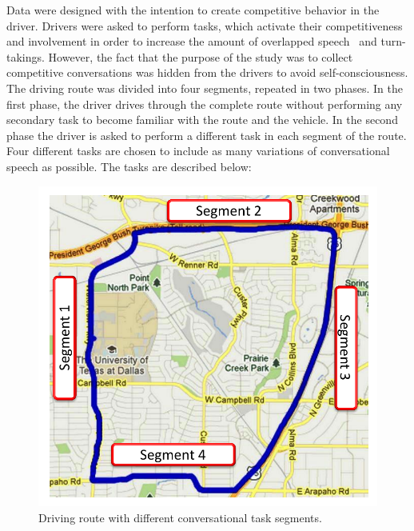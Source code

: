 Data were designed with the intention to create competitive behavior in the driver. 
Drivers were asked to perform tasks, which activate their competitiveness and involvement in order to increase the amount of overlapped speech~\cite{Schegloff} and turn-takings. 
However, the fact that the purpose of the study was to collect competitive conversations was hidden from the drivers to avoid self-consciousness. 
The driving route was divided into four segments, repeated in two phases. 
In the first phase, the driver drives through the complete route without performing any secondary task to become familiar with the route and the vehicle. 
In the second phase the driver is asked to perform a different task in each segment of the route. 
Four different tasks are chosen to include as many variations of conversational speech as possible. 
The tasks are described below:

\begin{figure}[h!]
	\centering
	\includegraphics[width=0.6\linewidth]{figures/route_map-crop}
	\caption {Driving route with different conversational task segments.}
	\label{fig:ch6_map}
\end{figure}


